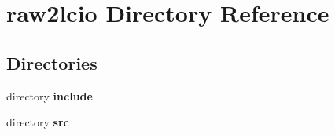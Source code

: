 \section{raw2lcio Directory Reference}
\label{dir_d51f661f953c6d25b6953a9f7980ab7f}
\subsection*{Directories}
\begin{DoxyCompactItemize}
\item 
directory {\bf include}
\item 
directory {\bf src}
\end{DoxyCompactItemize}
